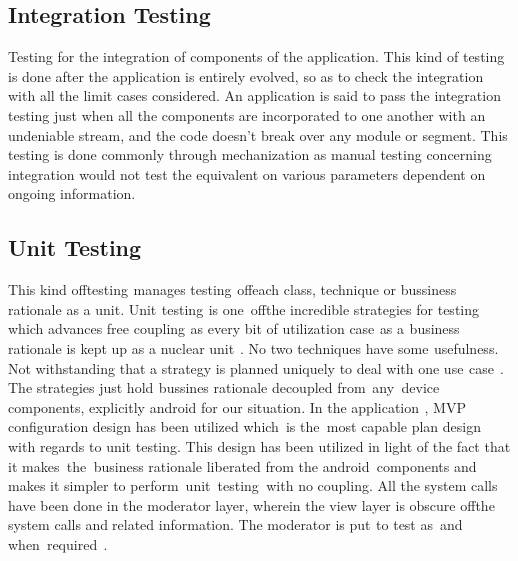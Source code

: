 \documentclass[oneside,12pt]{Classes/VTU}
\begin{document}
	\subsection{Integration Testing}
	Testing for the integration of components of the application. This kind of testing is done after the application is entirely evolved, so as to check the integration with all the limit cases considered. An application is said to pass the integration testing just when all the components are incorporated to one another with an undeniable stream, and the code doesn't break over any module or segment. This testing is done commonly through mechanization as manual testing concerning integration would not test the equivalent on various parameters dependent on ongoing information.
	
	\subsection{Unit Testing}
	This kind of\tiny\textcolor{white}{f}\normalsize testing\tiny\textcolor{white}{s}\normalsize manages testing\tiny\textcolor{white}{s}\normalsize of\tiny\textcolor{white}{f}\normalsize each class, technique or bussiness rationale as a unit. Unit\tiny\textcolor{white}{s}\normalsize testing\tiny\textcolor{white}{s}\normalsize is one\tiny\textcolor{white}{y}\normalsize of\tiny\textcolor{white}{f}\normalsize the incredible strategies for testing which advances free coupling\tiny\textcolor{white}{s}\normalsize as every bit of utilization case\tiny\textcolor{white}{s}\normalsize as a\tiny\textcolor{white}{s}\normalsize business rationale is kept up as a nuclear unit\tiny\textcolor{white}{y}\normalsize. No two techniques have some\tiny\textcolor{white}{s}\normalsize usefulness. Not withstanding that a strategy is planned uniquely to deal with one use\tiny\textcolor{white}{s}\normalsize case\tiny\textcolor{white}{y}\normalsize . The strategies just hold\tiny\textcolor{white}{s}\normalsize bussines rationale decoupled from\tiny\textcolor{white}{y}\normalsize any\tiny\textcolor{white}{y}\normalsize device components, explicitly android for our situation. In the application\tiny\textcolor{white}{s}\normalsize , MVP configuration design has been utilized which\tiny\textcolor{white}{y}\normalsize is the\tiny\textcolor{white}{y}\normalsize most capable plan design with regards to unit testing. This design has been utilized in light of the fact that it makes\tiny\textcolor{white}{y}\normalsize the\tiny\textcolor{white}{y}\normalsize business rationale liberated from the android\tiny\textcolor{white}{y}\normalsize components and makes it simpler to perform\tiny\textcolor{white}{y}\normalsize unit\tiny\textcolor{white}{y}\normalsize testing\tiny\textcolor{white}{y}\normalsize with no coupling. All the system calls have been done in the moderator layer, wherein the view layer is obscure of\tiny\textcolor{white}{f}\normalsize the system calls and\tiny\textcolor{white}{i}\normalsize related information. The moderator is put\tiny\textcolor{white}{s}\normalsize to test as\tiny\textcolor{white}{y}\normalsize and when\tiny\textcolor{white}{y}\normalsize required\tiny\textcolor{white}{y}\normalsize .
	
\end{document}
